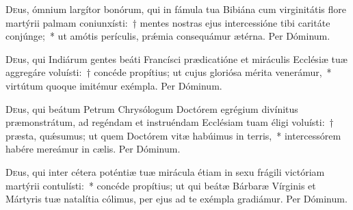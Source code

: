 \documentclass[vesperale_romanum.tex]{subfiles}
\begin{document}

\semiduplex

\oratio

\lettrine{D}{e}us, ó\-mnium largítor bonórum, qui in fámula tua Bibiána cum virginitátis flore martýrii palmam coniunxísti:~† mentes nostras ejus intercessióne tibi caritáte conjúnge;~* ut amótis perículis, prǽmia consequámur ætérna.
Per Dóminum.



\myrule


\duplexmajus

\oratio

\lettrine{D}{e}us, qui Indiárum gentes beáti Francísci prædicatióne et miráculis Ecclésiæ tuæ aggregáre voluísti:~† concéde propítius; ut cujus gloriósa mérita venerámur,~* virtútum quoque imitémur exémpla. Per Dóminum.



\myrule


\duplexmtv


\oratio

\lettrine{D}{e}us, qui beátum Petrum Chrysólogum Do\-ctórem egrégium divínitus præmonstrátum, ad regéndam et instruéndam Ecclésiam tuam éligi voluísti:~† præsta, quǽsumus; ut quem Do\-ctórem vitæ habúimus in terris,~* intercessórem habére mereámur in cælis. Per Dóminum.


\oratio

\lettrine{D}{e}us, qui inter cétera poténtiæ tuæ mirácula étiam in sexu frágili vi\-ctóriam martýrii contulísti:~* concéde propítius; ut qui beátæ Bárbaræ Vírginis et Mártyris tuæ natalítia cólimus, per ejus ad te exémpla gradiámur. Per Dóminum.
\end{document}
